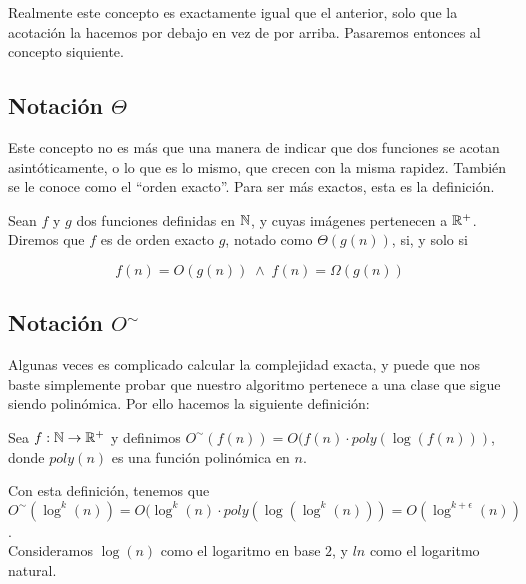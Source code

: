 Realmente este concepto es exactamente igual que el anterior, solo que la acotación la hacemos por debajo en vez de por arriba. Pasaremos entonces al concepto siquiente.

\subsection{Notación $\Theta$}

Este concepto no es más que una manera de indicar que dos funciones se acotan asintóticamente, o lo que es lo mismo, que crecen con la misma rapidez. También se le conoce como el ``orden exacto''. Para ser más exactos, esta es la definición.

\begin{definicion}
	Sean $f$ y $g$ dos funciones definidas en $\mathbb{N}$, y cuyas imágenes pertenecen a $\mathbb{R}^+$. Diremos que $f$ es de orden exacto $g$, notado como $\Theta(g(n))$, si, y solo si
	
	$$f(n) = O(g(n))\;\wedge\;f(n) = \Omega(g(n))$$
\end{definicion}

\subsection{Notación $O^\sim$}

Algunas veces es complicado calcular la complejidad exacta, y puede que nos baste simplemente probar que nuestro algoritmo pertenece a una clase que sigue siendo polinómica. Por ello hacemos la siguiente definición:

\begin{definicion}
	Sea $f:\mathbb{N} \to \mathbb{R}^+$ y definimos $O^\sim(f(n)) = O(f(n) \cdot poly(\log(f(n)))$, donde $poly(n)$ es una función polinómica en $n$.
\end{definicion}

Con esta definición, tenemos que $O^\sim(\log^k(n)) = O(\log^k(n) \cdot poly(\log(\log^k(n))) = O(\log^{k+\epsilon}(n))$.\\

Consideramos $\log(n)$ como el logaritmo en base $2$, y $ln$ como el logaritmo natural.

\endinput
